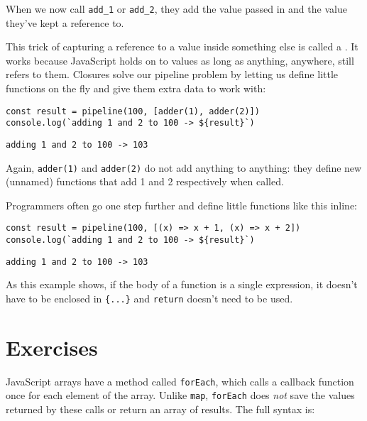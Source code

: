 When we now call \texttt{add\_1} or \texttt{add\_2},
they add the value passed in and the value they've kept a reference to.

This trick of capturing a reference to a value inside something else
is called a .
It works because JavaScript holds on to values as long as anything,
anywhere,
still refers to them.
Closures solve our pipeline problem by letting us define little functions
on the fly
and give them extra data to work with:

\begin{verbatim}
const result = pipeline(100, [adder(1), adder(2)])
console.log(`adding 1 and 2 to 100 -> ${result}`)
\end{verbatim}

\begin{verbatim}
adding 1 and 2 to 100 -> 103
\end{verbatim}

Again, \texttt{adder(1)} and \texttt{adder(2)} do not add anything to anything:
they define new (unnamed) functions that add 1 and 2 respectively when called.

Programmers often go one step further and define little functions like this inline:

\begin{verbatim}
const result = pipeline(100, [(x) => x + 1, (x) => x + 2])
console.log(`adding 1 and 2 to 100 -> ${result}`)
\end{verbatim}

\begin{verbatim}
adding 1 and 2 to 100 -> 103
\end{verbatim}

As this example shows,
if the body of a function is a single expression,
it doesn't have to be enclosed in \texttt{\{...\}} and \texttt{return} doesn't need to be used.

\section{Exercises}\label{s:callbacks-exercises}


JavaScript arrays have a method called \texttt{forEach},
which calls a callback function once for each element of the array.
Unlike \texttt{map},
\texttt{forEach} does \emph{not} save the values returned by these calls
or return an array of results.
The full syntax is:

